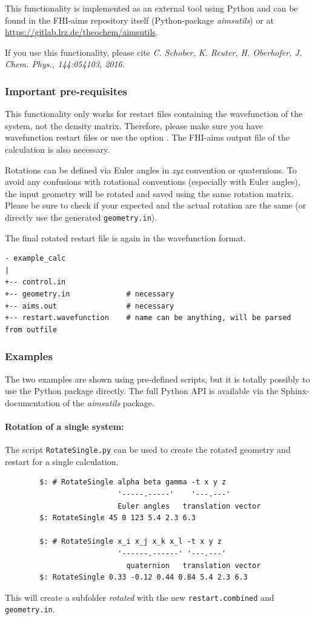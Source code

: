 This functionality is implemented as an external tool using Python and can be
found in the FHI-aims repository itself (Python-package \emph{aimsutils}) or at
\url{https://gitlab.lrz.de/theochem/aimsutils}.

If you use this functionality, please cite \emph{C. Schober, K. Reuter, H.
        Oberhofer, J. Chem. Phys., 144:054103, 2016}\cite{Schober2015}.

\subsubsection*{Important pre-requisites}
This functionality only works for restart files containing the wavefunction of
the system, not the density matrix. Therefore, please make sure you have
wavefunction restart files or use the option
. The FHI-aims output file of the
calculation is also necessary.

Rotations can be defined via Euler angles in \emph{zyz} convention or quaternions. 
To avoid any confusions with rotational conventions (especially with Euler
angles), the input geometry will be rotated and saved using the same rotation
matrix. Please be sure to check if your expected and the actual rotation are the
same (or directly use the generated \texttt{geometry.in}). 

The final rotated restart file is again in the wavefunction format.

\begin{verbatim}
- example_calc
|
+-- control.in              
+-- geometry.in             # necessary 
+-- aims.out                # necessary 
+-- restart.wavefunction    # name can be anything, will be parsed from outfile
\end{verbatim}

\subsubsection*{Examples}
The two examples are shown using pre-defined scripts, but it is
totally possibly to use the Python package directly. The full Python API is
available via the Sphinx-documentation of the \emph{aimsutils} package.

\paragraph{Rotation of a single system:} The script \texttt{RotateSingle.py} can be
used to create the rotated geometry and restart for a single calculation.
\begin{verbatim}
        $: # RotateSingle alpha beta gamma -t x y z
                          '-----.-----'    '---.---'
                          Euler angles   translation vector
        $: RotateSingle 45 0 123 5.4 2.3 6.3

        $: # RotateSingle x_i x_j x_k x_l -t x y z
                          '------.------' '---.---'
                            quaternion   translation vector
        $: RotateSingle 0.33 -0.12 0.44 0.84 5.4 2.3 6.3
\end{verbatim}
This will create a subfolder \emph{rotated} with the new \texttt{restart.combined}
and \texttt{geometry.in}.

